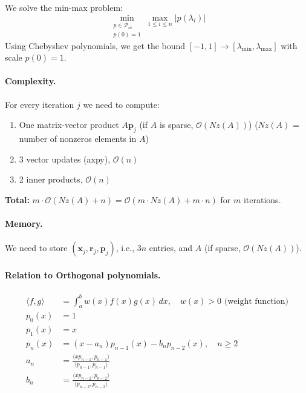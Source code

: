 We solve the min-max problem:
\[
    \min_{\substack{p \in \mathcal{P}_m \\ p(0) = 1}} \max_{1 \leq i \leq n} |p(\lambda_i)|
\]
Using Chebyshev polynomials, we get the bound $[-1, 1] \to [\lambda_{\min}, \lambda_{\max}]$ with scale $p(0) = 1$.


\paragraph{Complexity.}
For every iteration $j$ we need to compute:
\begin{enumerate}
    \item One matrix-vector product $A\mathbf{p}_j$ (if $A$ is sparse, $\mathcal{O}(Nz(A))$) ($Nz(A)$ = number of nonzeros elements in $A$)
    \item 3 vector updates (axpy), $\mathcal{O}(n)$
    \item 2 inner products, $\mathcal{O}(n)$
\end{enumerate}
\textbf{Total:} $m\cdot \mathcal{O}(Nz(A) + n) = \mathcal{O}(m \cdot Nz(A) + m \cdot n)$ for $m$ iterations.
\paragraph{Memory.}
We need to store $(\mathbf{x}_j, \mathbf{r}_j, \mathbf{p}_j)$, i.e., $3n$ entries, and $A$ (if sparse, $\mathcal{O}(Nz(A))$).

\paragraph{Relation to Orthogonal polynomials.}
\begin{align*}
    \langle f, g \rangle & = \int_a^b w(x) f(x) g(x) \, dx , \quad w(x) > 0 \text{ (weight function)}    \\
    p_0(x)               & = 1                                                                           \\
    p_1(x)               & = x                                                                           \\
    p_n(x)               & = (x - a_n) p_{n-1}(x) - b_n p_{n-2}(x), \quad n \geq 2                       \\
    a_n                  & = \frac{\langle x p_{n-1}, p_{n-1} \rangle}{\langle p_{n-1}, p_{n-1} \rangle} \\
    b_n                  & = \frac{\langle x p_{n-2}, p_{n-2} \rangle}{\langle p_{n-2}, p_{n-2} \rangle}
\end{align*}

